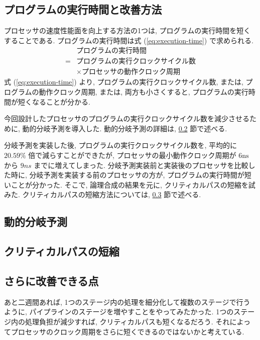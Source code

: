 \documentclass[../main.tex]{subfiles}
\begin{document}
  \subsection{プログラムの実行時間と改善方法}
  プロセッサの速度性能面を向上する方法の1つは, プログラムの実行時間を短くすることである.
  プログラムの実行時間は式 (\ref{eq:execution-time}) で求められる.
  \begin{equation}
    \begin{aligned}
      &プログラムの実行時間 \\
      = &プログラムの実行クロックサイクル数 \\
      &\times プロセッサの動作クロック周期
      \label{eq:execution-time}
    \end{aligned}
  \end{equation}
  式 (\ref{eq:execution-time}) より, プログラムの実行クロックサイクル数, 
  または, プログラムの動作クロック周期, 
  または, 両方も小さくすると, プログラムの実行時間が短くなることが分かる.

  今回設計したプロセッサのプログラムの実行クロックサイクル数を減少させるために, 動的分岐予測を導入した.
  動的分岐予測の詳細は, \ref{subsection:jump-prediction} 節で述べる.

  分岐予測を実装した後, プログラムの実行クロックサイクル数を, 
  平均的に $20.59\%$ 倍で減らすことができたが, 
  プロセッサの最小動作クロック周期が $6\unit{\ns}$ から $9\unit{ns}$ までに増えてしまった.
  分岐予測実装前と実装後のプロセッサを比較した時に, 
  分岐予測を実装する前のプロセッサの方が, 
  プログラムの実行時間が短いことが分かった.
  そこで, 論理合成の結果を元に, クリティカルパスの短縮を試みた.
  クリティカルパスの短縮方法については, \ref{subsection:critical-path} 節で述べる.

  \subsection{動的分岐予測} \label{subsection:jump-prediction}
  

  \subsection{クリティカルパスの短縮} \label{subsection:critical-path}
  

  \subsection{さらに改善できる点}
  あと二週間あれば, 1つのステージ内の処理を細分化して複数のステージで行うように, 
  パイプラインのステージを増やすことをやってみたかった.
  1つのステージ内の処理負担が減少すれば, クリティカルパスも短くなるだろう.
  それによってプロセッサのクロック周期をさらに短くできるのではないかと考えている.
\end{document}
